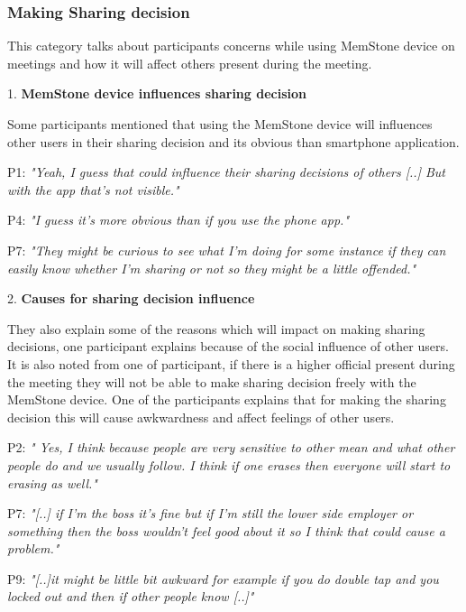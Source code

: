 \documentclass[mscthesis]{usiinfthesis}
\begin{document}
\subsubsection*{Making Sharing decision }
This category talks about participants concerns while using MemStone device on meetings and how it will affect others present during the meeting.
\newline

1. \textbf{MemStone device influences sharing decision}

Some participants mentioned that using the MemStone device will influences other users in their sharing decision and its obvious than smartphone application.
\newline
\hspace{\parindent}\begin{adjustwidth}{1cm}{1cm}
\hspace{\parindent}P1: \textit{"Yeah, I guess that could influence their sharing decisions of others [..] But with the app that's not visible."}

P4: \textit{"I guess it's more obvious than if you use the phone app."}

P7: \textit{"They might be curious to see what I'm doing for some instance if they can easily know whether I'm sharing or not so they might be a little offended."}
\newline
\end{adjustwidth}

2. \textbf{Causes for sharing decision influence}

They also explain some of the reasons which will impact on making sharing decisions, one participant explains because of the social influence of other users. It is also noted from one of participant, if there is a higher official present during the meeting they will not be able to make sharing decision freely with the MemStone device. One of the participants explains that for making the sharing decision this will cause awkwardness and affect feelings of other users. 
\newline
\hspace{\parindent}\begin{adjustwidth}{1cm}{1cm}
\hspace{\parindent}P2:\textit{ " Yes, I think because people are very sensitive to other mean and what other people do and we usually follow. I think if one erases then everyone will start to erasing as well."}

P7: \textit{"[..] if I'm the boss it's fine but if I'm still the lower side employer or something then the boss wouldn't feel good about it so I think that could cause a problem."}

P9: \textit{"[..]it might be little bit awkward for example if you do double tap and you locked out and then if other people know [..]"}
\newline
\end{adjustwidth}
\end{document}
